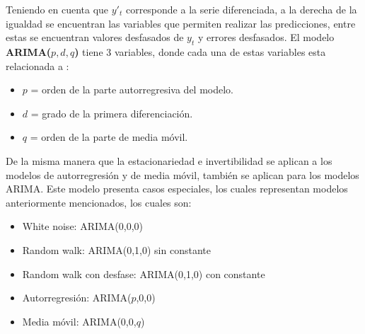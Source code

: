 Teniendo en cuenta que $y'_t$ corresponde a la serie diferenciada, a la derecha de la igualdad se encuentran las variables que permiten realizar las predicciones, entre estas se encuentran valores desfasados de $y_t$ y errores desfasados.
El modelo \textbf{ARIMA($p,d,q$)} tiene 3 variables, donde cada una de estas variables esta relacionada a \cite{forecast-time-series-arima}:
\begin{itemize}
    \item $p$ = orden de la parte autorregresiva del modelo.
    \item $d$ = grado de la primera diferenciación.
    \item $q$ = orden de la parte de media móvil.
\end{itemize}

De la misma manera que la estacionariedad e invertibilidad se aplican a los modelos de autorregresión y de media móvil, también se aplican para los modelos ARIMA. Este modelo presenta casos especiales, los cuales representan modelos anteriormente mencionados, los cuales son:
\begin{itemize}
    \item White noise: ARIMA(0,0,0)
    \item Random walk: ARIMA(0,1,0) sin constante
    \item Random walk con desfase: ARIMA(0,1,0) con constante
    \item Autorregresión: ARIMA($p$,0,0)
    \item Media móvil: ARIMA(0,0,$q$)
\end{itemize}
